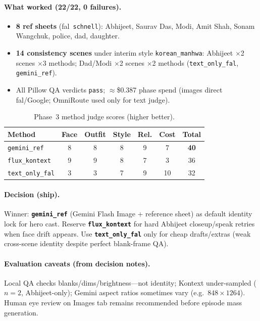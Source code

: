 \documentclass[10pt,twocolumn,letterpaper]{article}
\begin{document}
\paragraph{What worked (22/22, 0 failures).}
\begin{itemize}[leftmargin=*,itemsep=1pt]
  \item \textbf{8 ref sheets} (fal~\texttt{schnell}): Abhijeet, Saurav Das, Modi, Amit Shah, Sonam Wangchuk, police, dad, daughter.
  \item \textbf{14 consistency scenes} under interim style \texttt{korean\_manhwa}: Abhijeet $\times$2 scenes $\times$3 methods; Dad/Modi $\times$2 scenes $\times$2 methods (\texttt{text\_only\_fal}, \texttt{gemini\_ref}).
  \item All Pillow QA verdicts \texttt{pass}; $\approx$\$0.387 phase spend (images direct fal/Google; OmniRoute used only for text judge).
\end{itemize}

\begin{table}[t]
\centering
\caption{Phase~3 method judge scores (higher better).}
\label{tab:p3judge}
\small
\begin{tabular}{@{}lcccccc@{}}
\toprule
Method & Face & Outfit & Style & Rel. & Cost & Total \\
\midrule
\texttt{gemini\_ref} & 8 & 8 & 8 & 9 & 7 & \textbf{40} \\
\texttt{flux\_kontext} & 9 & 9 & 8 & 7 & 3 & 36 \\
\texttt{text\_only\_fal} & 3 & 3 & 7 & 9 & 10 & 32 \\
\bottomrule
\end{tabular}
\end{table}

\paragraph{Decision (ship).}
Winner: \textbf{\texttt{gemini\_ref}} (Gemini Flash Image + reference sheet) as default identity lock for hero cast.
Reserve \textbf{\texttt{flux\_kontext}} for hard Abhijeet closeup/speak retries when face drift appears.
Use \textbf{\texttt{text\_only\_fal}} only for cheap drafts/extras (weak cross-scene identity despite perfect blank-frame QA).

\paragraph{Evaluation caveats (from decision notes).}
Local QA checks blanks/dims/brightness---not identity; Kontext under-sampled ($n{=}2$, Abhijeet-only); Gemini aspect ratios sometimes vary (e.g.\ $848{\times}1264$).
Human eye review on Images tab remains recommended before episode mass generation.
\end{document}
